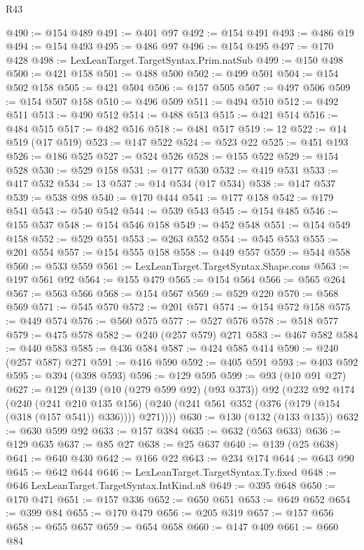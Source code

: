 \begin{lexlean}{R43}
\begin{coremodule}
@490 := @154 @489
@491 := @401 @97
@492 := @154 @491
@493 := @486 @19
@494 := @154 @493
@495 := @486 @97
@496 := @154 @495
@497 := @170 @428
@498 := LexLeanTarget.TargetSyntax.Prim.natSub
@499 := @150 @498
@500 := @421 @158
@501 := @488 @500
@502 := @499 @501
@504 := @154 @502 @158
@505 := @421 @504
@506 := @157 @505
@507 := @497 @506
@509 := @154 @507 @158
@510 := @496 @509
@511 := @494 @510
@512 := @492 @511
@513 := @490 @512
@514 := @488 @513
@515 := @421 @514
@516 := @484 @515
@517 := @482 @516
@518 := @481 @517
@519 := 12
@522 := @14 @519 (@17 @519)
@523 := @147 @522
@524 := @523 @22
@525 := @451 @193
@526 := @186 @525
@527 := @524 @526
@528 := @155 @522
@529 := @154 @528
@530 := @529 @158
@531 := @177 @530
@532 := @419 @531
@533 := @417 @532
@534 := 13
@537 := @14 @534 (@17 @534)
@538 := @147 @537
@539 := @538 @98
@540 := @170 @444
@541 := @177 @158
@542 := @179 @541
@543 := @540 @542
@544 := @539 @543
@545 := @154 @485
@546 := @155 @537
@548 := @154 @546 @158
@549 := @452 @548
@551 := @154 @549 @158
@552 := @529 @551
@553 := @263 @552
@554 := @545 @553
@555 := @201 @554
@557 := @154 @555 @158
@558 := @449 @557
@559 := @544 @558
@560 := @533 @559
@561 := LexLeanTarget.TargetSyntax.Shape.cons
@563 := @197 @561 @92
@564 := @155 @479
@565 := @154 @564
@566 := @565 @264
@567 := @563 @566
@568 := @154 @567
@569 := @529 @220
@570 := @568 @569
@571 := @545 @570
@572 := @201 @571
@574 := @154 @572 @158
@575 := @449 @574
@576 := @560 @575
@577 := @527 @576
@578 := @518 @577
@579 := @475 @578
@582 := @240 (@257 @579) @271
@583 := @467 @582
@584 := @440 @583
@585 := @436 @584
@587 := @424 @585 @414
@590 := @240 (@257 @587) @271
@591 := @416 @590
@592 := @405 @591
@593 := @403 @592
@595 := @394 (@398 @593)
@596 := @129 @595
@599 := @93 (@10 @91 @27)
@627 := @129
    (@139
      (@10 (@279 @599 @92) (@93 @373))
      @92
      (@232
        @92
        @174
        (@240
          (@241 @210 @135 @156)
          (@240 (@241 @561 @352 (@376 (@179 (@154 (@318 (@157 @541)) @336)))) @271))))
@630 := @130 (@132 (@133 @135))
@632 := @630 @599 @92
@633 := @157 @384
@635 := @632 (@563 @633)
@636 := @129 @635
@637 := @85 @27
@638 := @25 @637
@640 := @139 (@25 @638)
@641 := @640 @430
@642 := @166 @22
@643 := @234 @174
@644 := @643 @90
@645 := @642 @644
@646 := LexLeanTarget.TargetSyntax.Ty.fixed
@648 := @646 LexLeanTarget.TargetSyntax.IntKind.u8
@649 := @395 @648
@650 := @170 @471
@651 := @157 @336
@652 := @650 @651
@653 := @649 @652
@654 := @399 @84
@655 := @170 @479
@656 := @205 @319
@657 := @157 @656
@658 := @655 @657
@659 := @654 @658
@660 := @147 @409
@661 := @660 @84

\end{coremodule}
\end{lexlean}
